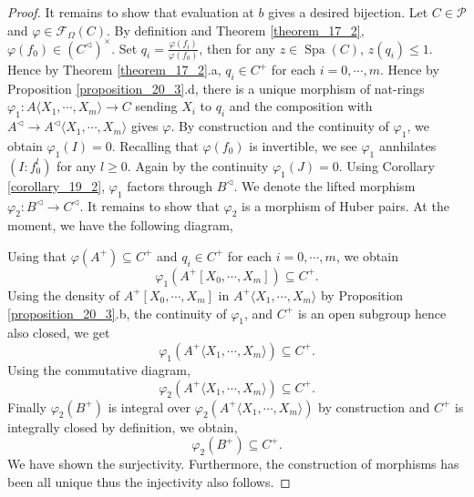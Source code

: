 \documentclass[8pt]{article}
\numberwithin{equation}{section}
\DeclareMathOperator{\Spa}{Spa}
\newcommand{\cF}[0]{\mathcal{F}}
\newcommand{\comppol}[1]{\langle X_1,\cdots, X_{#1}\rangle}
\begin{document}
\begin{proof}
    \par It remains to show that evaluation at $b$ gives a desired bijection. Let $C\in\mathcal{P}$ and $\varphi\in\cF_\Omega(C)$. By definition and Theorem \ref{theorem_17_2}, $\varphi(f_0)\in (C^\triangleleft)^\times$. Set $q_i = {\frac {\varphi(f_i)}{\varphi(f_0)}}$, then for any $z\in\Spa(C)$, $z(q_i)\leq 1$. Hence by Theorem \ref{theorem_17_2}.a, $q_i\in C^+$ for each $i=0,\cdots,m$.
    Hence by Proposition \ref{proposition_20_3}.d, there is a unique morphism of nat-rings $\varphi_1:A\comppol{m}\to C$ sending $X_i$ to $q_i$ and the composition with $A^\triangleleft\to A^\triangleleft\comppol{m}$ gives $\varphi$. By construction and the continuity of $\varphi_1$, we obtain $\varphi_1(I)=0$.
    Recalling that $\varphi(f_0)$ is invertible, we see $\varphi_1$ annhilates $(I:f_0^l)$ for any $l\geq0$. Again by the continuity $\varphi_1(J)=0$. Using Corollary \ref{corollary_19_2}, $\varphi_1$ factors through $B^\triangleleft$. We denote the lifted morphism $\varphi_2:B^\triangleleft\to C^\triangleleft$. It remains to show that $\varphi_2$ is a morphism of Huber pairs. At the moment, we have the following diagram,
    \begin{center}
    \end{center}
    Using that $\varphi(A^+)\subseteq C^+$ and $q_i\in C^+$ for each $i=0,\cdots,m$, we obtain 
    \begin{equation*}
        \varphi_1(A^+[X_0,\cdots,X_m])\subseteq C^+.
    \end{equation*}
    Using the density of $A^+[X_0,\cdots,X_m]$ in $A^+\comppol{m}$ by Proposition \ref{proposition_20_3}.b, the continuity of $\varphi_1$, and $C^+$ is an open subgroup hence also closed, we get 
    \begin{equation*}
        \varphi_1(A^+\comppol{m})\subseteq C^+.
    \end{equation*}
    Using the commutative diagram,
    \begin{equation*}
        \varphi_2(A^+\comppol{m})\subseteq C^+.
    \end{equation*}
    Finally $\varphi_2(B^+)$ is integral over $\varphi_2(A^+\comppol{m})$ by construction and $C^+$ is integrally closed by definition, we obtain,
    \begin{equation*}
        \varphi_2(B^+)\subseteq C^+.
    \end{equation*}
    We have shown the surjectivity. Furthermore, the construction of morphisms has been all unique thus the injectivity also follows.
\end{proof}
\end{document}
